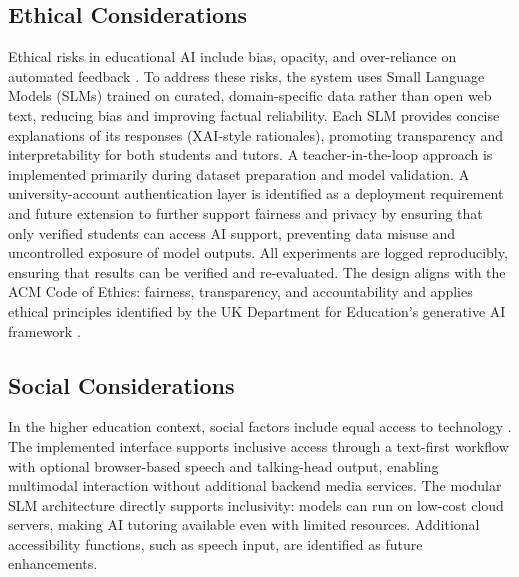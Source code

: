 \subsection{Ethical Considerations}
Ethical risks in educational AI include bias, opacity, and over-reliance on automated feedback \parencite{ChatGPTf63:online,Practica79:online}. To address these risks, the system uses Small Language Models (SLMs) trained on curated, domain-specific data rather than open web text, reducing bias and improving factual reliability. Each SLM provides concise explanations of its responses (XAI-style rationales), promoting transparency and interpretability for both students and tutors. A teacher-in-the-loop approach is implemented primarily during dataset preparation and model validation. A university-account authentication layer is identified as a deployment requirement and future extension to further support fairness and privacy by ensuring that only verified students can access AI support, preventing data misuse and uncontrolled exposure of model outputs. All experiments are logged reproducibly, ensuring that results can be verified and re-evaluated. The design aligns with the ACM Code of Ethics: fairness, transparency, and accountability \parencite{CodeofEt55:online} and applies ethical principles identified by the UK Department for Education's generative AI framework \parencite{Untitled13:online}.

\subsection{Social Considerations}
In the higher education context, social factors include equal access to technology \parencite{Untitled13:online}. The implemented interface supports inclusive access through a text-first workflow with optional browser-based speech and talking-head output, enabling multimodal interaction without additional backend media services. The modular SLM architecture directly supports inclusivity: models can run on low-cost cloud servers, making AI tutoring available even with limited resources. Additional accessibility functions, such as speech input, are identified as future enhancements.

